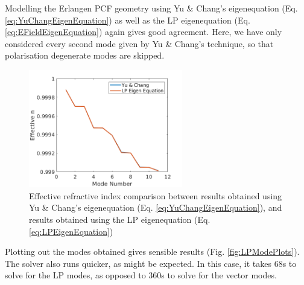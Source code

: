 \documentclass[]{article}
\begin{document}
Modelling the Erlangen PCF geometry using Yu \& Chang's eigenequation (Eq. \ref{eq:YuChangEigenEquation}) as well as the LP eigenequation (Eq. \ref{eq:EFieldEigenEquation}) again gives good agreement. Here, we have only considered every second mode given by Yu \& Chang's technique, so that polarisation degenerate modes are skipped.

\begin{figure}[htb]
	\centering
	\includegraphics[width=0.6\textwidth]{Figures/YuChang_LPEigenEquation}
	\caption{Effective refractive index comparison between results obtained using Yu \& Chang's eigenequation (Eq. \ref{eq:YuChangEigenEquation}), and results obtained using the LP eigenequation (Eq. \ref{eq:LPEigenEquation})}
\end{figure}

Plotting out the modes obtained gives sensible results (Fig. \ref{fig:LPModePlots}). The solver also runs quicker, as might be expected. In this case, it takes 68s to solve for the LP modes, as opposed to 360s to solve for the vector modes.
\end{document}
